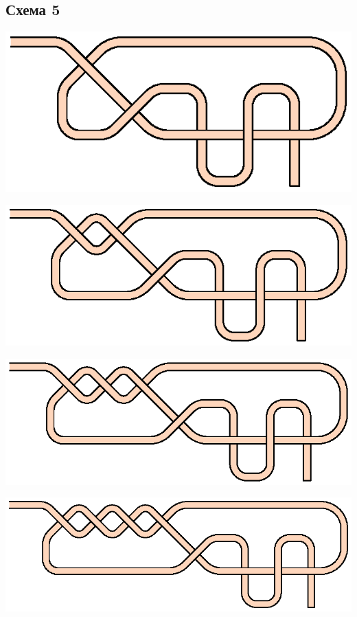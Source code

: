 \subsection{Схема 5}
\graphicspath{{\currentpath}}

\includegraphics{images/s-05-a1b1.eps}

\includegraphics{images/s-05-a2b1.eps}

\includegraphics{images/s-05-a3b1.eps}

\includegraphics{images/s-05-a4b1.eps}

